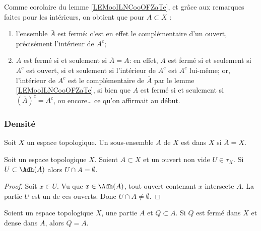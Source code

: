 \begin{remark}\label{RemAdhFerme}
	Comme corolaire du lemme \ref{LEMooILNCooOFZaTe}, et grâce aux remarques faites pour les intérieurs, on obtient que pour \( A \subset X \) :
	\begin{enumerate}
		\item l'ensemble \( \bar A \) est fermé: c'est en effet le complémentaire d'un ouvert, précisément l'intérieur de \( A^c \);
		\item \( A \) est fermé si et seulement si \( \bar A = A \): en effet, \( A \) est fermé si et seulement si \( A^c \) est ouvert, si et seulement si l'intérieur de \( A^c \) est \( A^c \) lui-même; or, l'intérieur de \( A^c \) est le complémentaire de \( \bar A \) par le lemme \ref{LEMooILNCooOFZaTe}, si bien que \( A \) est fermé si et seulement si \( (\bar A)^c  = A^c \), ou encore\dots{} ce qu'on affirmait au début.
	\end{enumerate}
\end{remark}


\subsubsection{Densité}


\begin{definition}\label{DefEnsembleDense}
	Soit \( X \) un espace topologique. Un sous-ensemble \( A \) de \( X \) est  dans \( X \) si \( \bar A = X\).
\end{definition}


\begin{lemma}	\label{LEMooITBVooBUYpve}
	Soit un espace topologique \( X\). Soient \( A\subset X\) et un ouvert non vide \( U\in\tau_X\). Si \( U\subset\Adh(A)\) alors \( U\cap A=\emptyset\).
\end{lemma}

\begin{proof}
	Soit \( x\in U\). Vu que \( x\in\Adh(A)\), tout ouvert contenant \( x\) intersecte \( A\). La partie \( U\) est un de ces ouverts. Donc \( U\cap A\neq\emptyset\).
\end{proof}

\begin{proposition}	\label{PROPooTKHVooMderxm}
	Soient un espace topologique \( X\), une partie \( A\) et \( Q\subset A\). Si \( Q\) est fermé dans \( X\) et dense dans \( A\), alors \( Q=A\).
\end{proposition}

